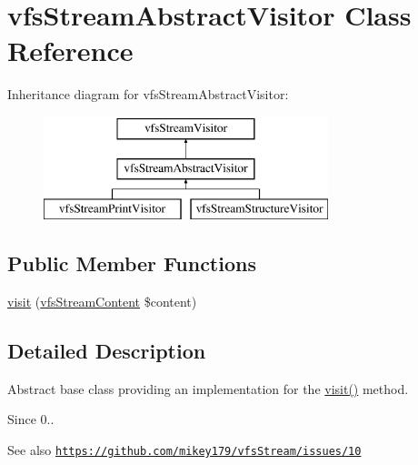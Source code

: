 \hypertarget{classorg_1_1bovigo_1_1vfs_1_1visitor_1_1vfs_stream_abstract_visitor}{}\section{vfs\+Stream\+Abstract\+Visitor Class Reference}
\label{classorg_1_1bovigo_1_1vfs_1_1visitor_1_1vfs_stream_abstract_visitor}
Inheritance diagram for vfs\+Stream\+Abstract\+Visitor\+:\begin{figure}[H]
\begin{center}
\leavevmode
\includegraphics[height=3.000000cm]{classorg_1_1bovigo_1_1vfs_1_1visitor_1_1vfs_stream_abstract_visitor}
\end{center}
\end{figure}
\subsection*{Public Member Functions}
\begin{DoxyCompactItemize}
\item 
\mbox{\hyperlink{classorg_1_1bovigo_1_1vfs_1_1visitor_1_1vfs_stream_abstract_visitor_ad262024718e58f64d782ed2a392b0702}{visit}} (\mbox{\hyperlink{interfaceorg_1_1bovigo_1_1vfs_1_1vfs_stream_content}{vfs\+Stream\+Content}} \$content)
\end{DoxyCompactItemize}


\subsection{Detailed Description}
Abstract base class providing an implementation for the \mbox{\hyperlink{classorg_1_1bovigo_1_1vfs_1_1visitor_1_1vfs_stream_abstract_visitor_ad262024718e58f64d782ed2a392b0702}{visit()}} method.

\begin{DoxySince}{Since}
0.. 
\end{DoxySince}
\begin{DoxySeeAlso}{See also}
\href{https://github.com/mikey179/vfsStream/issues/10}{\tt https\+://github.\+com/mikey179/vfs\+Stream/issues/10} 
\end{DoxySeeAlso}


